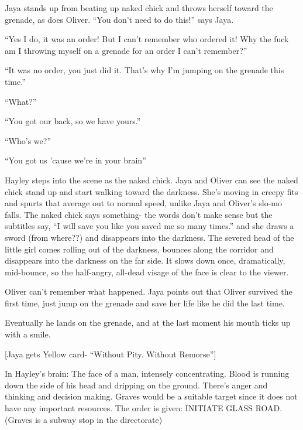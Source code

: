 Jaya stands up from beating up naked chick and throws herself toward the grenade, as does Oliver.  ``You don't need to do this!'' says Jaya.

``Yes I do, it was an order!  But I can't remember who ordered it!  Why the fuck am I throwing myself on a grenade for an order I can't remember?''

``It was no order, you just did it.  That's why I'm jumping on the grenade this time.''

``What?''

``You got our back, so we have yours.''

``Who's we?''

``You got us 'cause we're in your brain''



Hayley steps into the scene as the naked chick.  Jaya and Oliver can see the naked chick stand up and start walking toward the darkness.  She's moving in creepy fits and spurts that average out to normal speed, unlike Jaya and Oliver's slo-mo falls.  The naked chick says something- the words don't make sense but the subtitles say, ``I will save you like you saved me so many times.'' and she draws a sword (from where??) and disappears into the darkness.  The severed head of the little girl comes rolling out of the darkness, bounces along the corridor and disappears into the darkness on the far side. It slows down once, dramatically, mid-bounce, so the half-angry, all-dead visage of the face is clear to the viewer.



Oliver can't remember what happened.  Jaya points out that Oliver survived the first time, just jump on the grenade and save her life like he did the last time. 



Eventually he lands on the grenade, and at the last moment his mouth ticks up with a smile.  



{[}Jaya gets Yellow card- ``Without Pity. Without Remorse''{]}



 In Hayley's brain:  The face of a man, intensely concentrating.  Blood is running down the side of his head and dripping on the ground.  There's anger and thinking and decision making.  Graves would be a suitable target since it does not have any important resources.  The order is given: INITIATE GLASS ROAD. (Graves is a subway stop in the directorate) 


